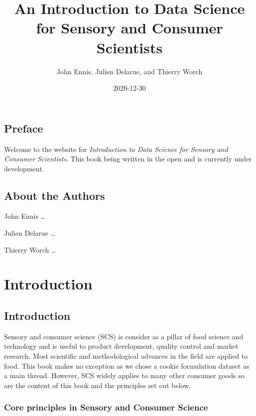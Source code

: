 \documentclass[
]{book}
\title{An Introduction to Data Science for Sensory and Consumer Scientists}
\author{John Ennis, Julien Delarue, and Thierry Worch}
\date{2020-12-30}
\begin{document}
\maketitle

{
\setcounter{tocdepth}{1}
\tableofcontents
}
\hypertarget{preface}{%
\chapter*{Preface}\label{preface}}

Welcome to the website for \emph{Introduction to Data Science for Sensory and Consumer Scientists}. This book being written in the open and is currently under development.

\hypertarget{about-the-authors}{%
\chapter*{About the Authors}\label{about-the-authors}}

John Ennis \ldots{}

Julien Delarue \ldots{}

Thierry Worch \ldots{}

\hypertarget{part-introduction}{%
\part*{Introduction}\label{part-introduction}}

\hypertarget{intro}{%
\chapter{Introduction}\label{intro}}

Sensory and consumer science (SCS) is consider as a pillar of food science and technology and is useful to product development, quality control and market research. Most scientific and methodological advances in the field are applied to food. This book makes no exception as we chose a cookie formulation dataset as a main thread. However, SCS widely applies to many other consumer goods so are the content of this book and the principles set out below.

\hypertarget{core-principles-in-sensory-and-consumer-science}{%
\section{Core principles in Sensory and Consumer Science}\label{core-principles-in-sensory-and-consumer-science}}
\end{document}
